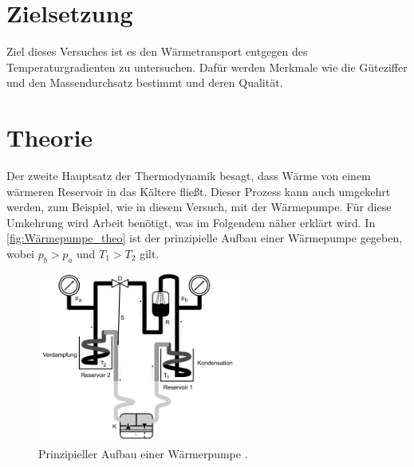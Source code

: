 \section{Zielsetzung}
\label{sec:Zielsetzung}
Ziel dieses Versuches ist es den Wärmetransport entgegen des Temperaturgradienten zu untersuchen. 
Dafür werden Merkmale wie die Güteziffer und den Massendurchsatz bestimmt und deren Qualität.

\section{Theorie}
\label{sec:Theorie}
Der zweite Hauptsatz der Thermodynamik besagt, dass Wärme von einem wärmeren Reservoir in das Kältere fließt.
Dieser Prozess kann auch umgekehrt werden, zum Beispiel, wie in diesem Versuch, mit der Wärmepumpe.
Für diese Umkehrung wird Arbeit benötigt, was im Folgendem näher erklärt wird. 
In \autoref{fig:Wärmepumpe_theo} ist der prinzipielle Aufbau einer Wärmepumpe gegeben, wobei $p_b>p_a$ und $T_1>T_2$ gilt.
\begin{figure}
    \centering
    \includegraphics[width=0.6\textwidth]{build/Abb1.png}
    \caption{Prinzipieller Aufbau einer Wärmerpumpe \cite[196]{V206}.}
    \label{fig:Wärmepumpe_theo}
\end{figure}


